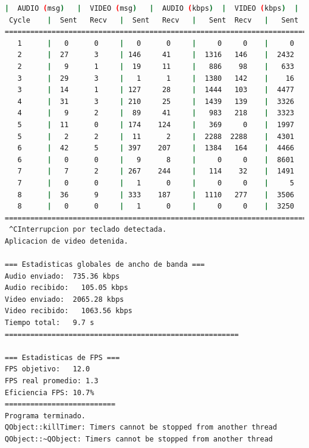 \begin{lstlisting}[language=bash,basicstyle=\ttfamily\scriptsize]
          |  AUDIO (msg)   |  VIDEO (msg)   |  AUDIO (kbps)  |  VIDEO (kbps)  |   CPU (%)
 Cycle    |  Sent   Recv   |  Sent   Recv   |   Sent  Recv   |   Sent  Recv   | Program System
============================================================================================
   1      |   0      0     |   0      0     |     0     0    |     0     0    |   0      0
   2      |  27      3     | 146     41     |  1316   146    |  2432    683   |  11     73
   2      |   9      1     |  19     11     |   886    98    |   633    370   |  36     72
   3      |  29      3     |   1      1     |  1380   142    |    16     16   |  37     86
   3      |  14      1     | 127     28     |  1444   103    |  4477    980   |  37     90
   4      |  31      3     | 210     25     |  1439   139    |  3326    396   |  42     78
   4      |   9      2     |  89     41     |   983   218    |  3323   1531   |  43     75
   5      |  11      0     | 174    124     |   369     0    |  1997   1425   |  44     28
   5      |   2      2     |  11      2     |  2288  2288    |  4301    782   |  69     22
   6      |  42      5     | 397    207     |  1384   164    |  4466   2330   |  41     79
   6      |   0      0     |   9      8     |     0     0    |  8601   7646   |   0     79
   7      |   7      2     | 267    244     |   114    32    |  1491   1362   |  43      6
   7      |   0      0     |   1      0     |     0     0    |     5      0   |   0      8
   8      |  36      9     | 333    187     |  1110   277    |  3506   1969   |  30     78
   8      |   0      0     |   1      0     |     0     0    |  3250      0   | 290     78
============================================================================================
 ^CInterrupcion por teclado detectada.
Aplicacion de video detenida.

=== Estadisticas globales de ancho de banda ===
Audio enviado:	735.36 kbps
Audio recibido:   105.05 kbps
Video enviado:	2065.28 kbps
Video recibido:   1063.56 kbps
Tiempo total: 	9.7 s
=======================================================

=== Estadisticas de FPS ===
FPS objetivo: 	12.0
FPS real promedio: 1.3
Eficiencia FPS:	10.7%
==========================
Programa terminado.
QObject::killTimer: Timers cannot be stopped from another thread
QObject::~QObject: Timers cannot be stopped from another thread
\end{lstlisting}

